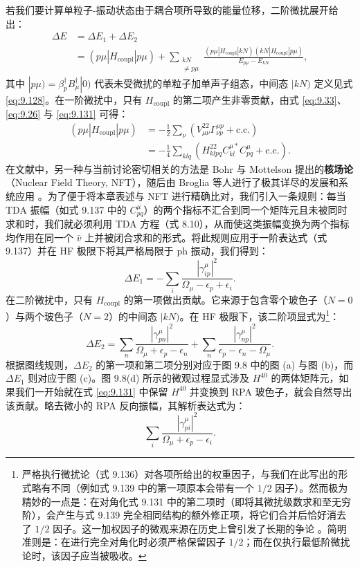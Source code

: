 若我们要计算单粒子-振动状态由于耦合项所导致的能量位移，二阶微扰展开给出：
\begin{align}
\Delta E & =\Delta E_{1}+\Delta E_{2}\nonumber \\
 & =(p\mu|H_{\text{coupl}}|p\mu)+\sum_{\substack{kN\\
\ne p\mu
}
}\frac{(p\mu|H_{\text{coupl}}|kN)(kN|H_{\text{coupl}}|p\mu)}{E_{p\mu}-E_{kN}},\label{eq:9.136}
\end{align}
其中 $|p\mu)=\beta^{\dagger}_{p}B^{\dagger}_{\mu}|0)$ 代表未受微扰的单粒子加单声子组态，中间态
$|kN)$ 定义见式 \ref{eq:9.128}。在一阶微扰中，只有 $H_{\text{coupl}}$ 的第二项产生非零贡献，由式
\ref{eq:9.33}、\ref{eq:9.26} 与 \ref{eq:9.131} 可得：
\begin{align}
(p\mu|H_{\text{coupl}}|p\mu) & =-\frac{1}{2}\sum_{\nu}\left(V^{22}_{\mu\nu}\Gamma^{\mu p}_{\nu p}+\text{c.c.}\right)\nonumber \\
 & =-\frac{1}{4}\sum_{klq}\left(H^{22}_{klpq}C^{\mu*}_{kl}C^{\mu}_{pq}+\text{c.c.}\right).\label{eq:9.137}
\end{align}
在文献中，另一种与当前讨论密切相关的方法是 Bohr 与 Mottelson 提出的\textbf{核场论}（Nuclear Field
Theory, NFT）\cite{Mo67,BM75}，随后由 Broglia 等人进行了极其详尽的发展和系统应用 \cite{BBB77}。为了便于将本章表述与
NFT 进行精确比对，我们引入一条规则：每当 TDA 振幅（如式 9.137 中的 $C^{\mu}_{pq}$）的两个指标不汇合到同一个矩阵元且未被同时求和时，我们就必须利用
TDA 方程（式 8.10），从而使这类振幅变换为两个指标均作用在同一个 $\bar{v}$ 上并被闭合求和的形式。将此规则应用于一阶表达式（式
9.137）并在 HF 极限下将其严格局限于 ph 振动，我们得到：
\begin{equation}
\Delta E_{1}=-\sum_{i}\frac{|\gamma^{\mu}_{ip}|^{2}}{\Omega_{\mu}-\epsilon_{p}+\epsilon_{i}}.\label{eq:9.138}
\end{equation}
在二阶微扰中，只有 $H_{\text{coupl}}$ 的第一项做出贡献。它来源于包含零个玻色子（$N=0$）与两个玻色子（$N=2$）的中间态
$|kN)$。在 HF 极限下，该二阶项显式为\footnote{严格执行微扰论（式 9.136）对各项所给出的权重因子，与我们在此写出的形式略有不同（例如式 9.139 中的第一项原本会带有一个
$1/2$ 因子）。然而极为精妙的一点是：在对角化式 9.131 中的第二项时（即将其微扰级数求和至无穷阶），会产生与式 9.139
完全相同结构的额外修正项，将它们合并后恰好消去了 $1/2$ 因子。这一加权因子的微观来源在历史上曾引发了长期的争论 \cite{JDK69,El70}。简明准则是：在进行完全对角化时必须严格保留因子
$1/2$；而在仅执行最低阶微扰论时，该因子应当被吸收。}：
\begin{equation}
\Delta E_{2}=\sum_{n}\frac{|\gamma^{\mu}_{pn}|^{2}}{\Omega_{\mu}+\epsilon_{p}-\epsilon_{n}}+\sum_{n}\frac{|\gamma^{\mu}_{np}|^{2}}{\epsilon_{p}-\epsilon_{n}-\Omega_{\mu}}.\label{eq:9.139}
\end{equation}
根据图线规则，$\Delta E_{2}$ 的第一项和第二项分别对应于图 9.8 中的图 (a) 与图 (b)，而 $\Delta E_{1}$
则对应于图 (c)。图 9.8(d) 所示的微观过程显式涉及 $H^{40}$ 的两体矩阵元，如果我们一开始就在式 \ref{eq:9.131}
中保留 $H^{40}$ 并变换到 RPA 玻色子，就会自然导出该贡献。略去微小的 RPA 反向振幅，其解析表达式为：
\begin{equation}
\sum_{i}\frac{|\gamma^{\mu}_{pi}|^{2}}{\Omega_{\mu}+\epsilon_{p}-\epsilon_{i}}.\label{eq:9.140}
\end{equation}

